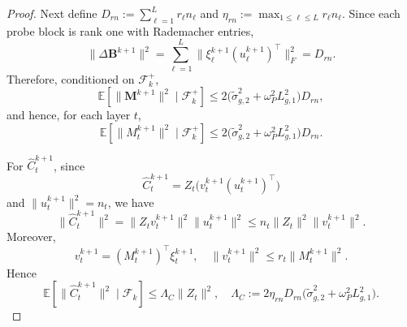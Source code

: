 \documentclass{pkumelon}
\theoremstyle{plain}
\newcommand{\E}{\mathbb{E}}
\begin{document}
\begin{proof}
Next define $D_{rn}:=\sum_{\ell=1}^L r_\ell n_\ell$ and $\eta_{rn}:=\max_{1\le \ell\le L} r_\ell n_\ell$. Since each probe block is rank one with Rademacher entries,
\begin{equation*}
\|\Delta\boldsymbol B^{k+1}\|^2=\sum_{\ell=1}^L \|\xi_\ell^{k+1}(u_\ell^{k+1})^\top\|_F^2=D_{rn}.
\end{equation*}
Therefore, conditioned on $\mathcal F_k^+$,
\begin{equation*}
\E[\|\boldsymbol M^{k+1}\|^2\mid \mathcal F_k^+] \le 2\bigl(\tilde\sigma_{g,2}^2+\omega_P^2L_{g,1}^2\bigr)D_{rn},
\end{equation*}
and hence, for each layer $t$,
\begin{equation*}
\E[\|M_t^{k+1}\|^2\mid \mathcal F_k^+] \le 2\bigl(\tilde\sigma_{g,2}^2+\omega_P^2L_{g,1}^2\bigr)D_{rn}.
\end{equation*}

For $\widehat C_t^{k+1}$, since
\begin{equation*}
\widehat C_t^{k+1}=Z_t\bigl(v_t^{k+1}(u_t^{k+1})^\top\bigr)
\end{equation*}
and $\|u_t^{k+1}\|^2=n_t$, we have
\begin{equation*}
\|\widehat C_t^{k+1}\|^2 = \|Z_t v_t^{k+1}\|^2\|u_t^{k+1}\|^2 \le n_t\|Z_t\|^2\|v_t^{k+1}\|^2.
\end{equation*}
Moreover,
\begin{equation*}
v_t^{k+1}=(M_t^{k+1})^\top\xi_t^{k+1}, \quad \|v_t^{k+1}\|^2\le r_t\|M_t^{k+1}\|^2.
\end{equation*}
Hence
\begin{equation*}
\E[\|\widehat C_t^{k+1}\|^2\mid \mathcal F_k] \le \Lambda_C\|Z_t\|^2, \quad \Lambda_C:=2\eta_{rn}D_{rn}\bigl(\tilde\sigma_{g,2}^2+\omega_P^2L_{g,1}^2\bigr).
\end{equation*}


\end{proof}
\end{document}

